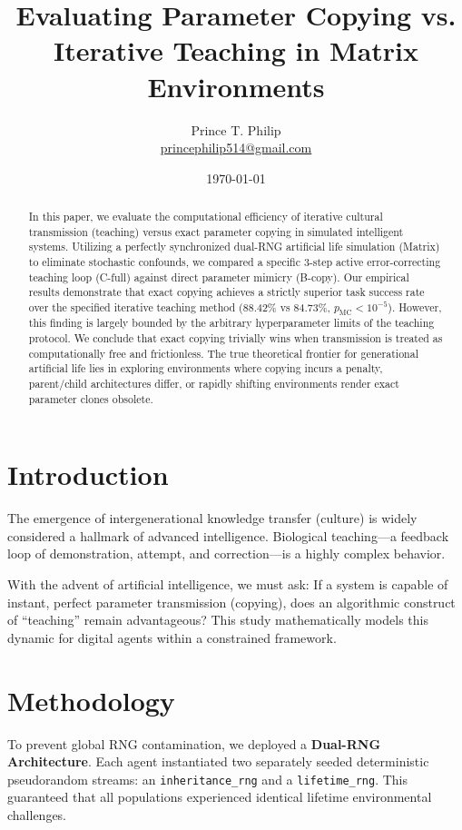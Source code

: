 \documentclass[12pt]{article}
\title{Evaluating Parameter Copying vs. Iterative Teaching in Matrix Environments}
\author{Prince T. Philip \\ \href{mailto:princephilip514@gmail.com}{princephilip514@gmail.com}}
\date{\today}
\begin{document}
\maketitle

\begin{abstract}
In this paper, we evaluate the computational efficiency of iterative cultural transmission (teaching) versus exact parameter copying in simulated intelligent systems. Utilizing a perfectly synchronized dual-RNG artificial life simulation (Matrix) to eliminate stochastic confounds, we compared a specific 3-step active error-correcting teaching loop (C-full) against direct parameter mimicry (B-copy). Our empirical results demonstrate that exact copying achieves a strictly superior task success rate over the specified iterative teaching method (88.42\% vs 84.73\%, $p_{\mathrm{MC}} < 10^{-5}$). However, this finding is largely bounded by the arbitrary hyperparameter limits of the teaching protocol. We conclude that exact copying trivially wins when transmission is treated as computationally free and frictionless. The true theoretical frontier for generational artificial life lies in exploring environments where copying incurs a penalty, parent/child architectures differ, or rapidly shifting environments render exact parameter clones obsolete.
\end{abstract}

\section{Introduction}
The emergence of intergenerational knowledge transfer (culture) is widely considered a hallmark of advanced intelligence. Biological teaching---a feedback loop of demonstration, attempt, and correction---is a highly complex behavior.

With the advent of artificial intelligence, we must ask: If a system is capable of instant, perfect parameter transmission (copying), does an algorithmic construct of ``teaching'' remain advantageous? This study mathematically models this dynamic for digital agents within a constrained framework. 

\section{Methodology}
To prevent global RNG contamination, we deployed a \textbf{Dual-RNG Architecture}. Each agent instantiated two separately seeded deterministic pseudorandom streams: an \texttt{inheritance\_rng} and a \texttt{lifetime\_rng}. This guaranteed that all populations experienced identical lifetime environmental challenges.
\end{document}
